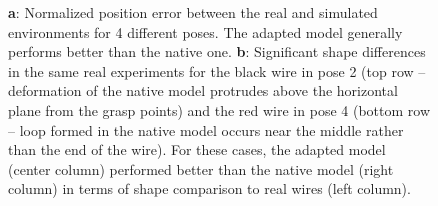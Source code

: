 \documentclass[letterpaper, 10 pt, conference]{ieeeconf}  %
\begin{document}
\begin{figure}[htp]
	\vspace{-0.5cm}
	\caption{\textbf{a}: Normalized position error between the real and simulated environments for 4 different poses. The adapted model generally performs better than the native one. \textbf{b}: Significant shape differences in the same real experiments for the black wire in pose 2 (top row -- deformation of the native model protrudes above the horizontal plane from the grasp points) and the red wire in pose 4 (bottom row -- loop formed in the native model occurs near the middle rather than the end of the wire). For these cases, the adapted model (center column) performed better than the native model (right column) in terms of shape comparison to real wires (left column).}
	\label{fig:simvreal}
	\vspace{-0.3cm}
\end{figure}
\end{document}
